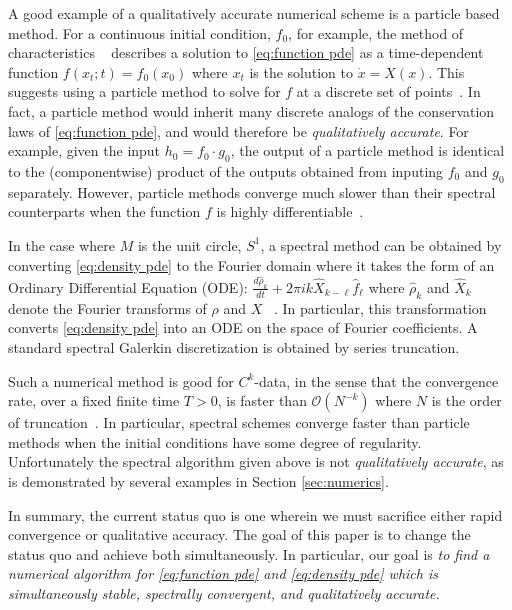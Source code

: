 \documentclass[final,leqno]{siamart}
\begin{document}
A good example of a qualitatively accurate numerical scheme is a particle based method.
For a continuous initial condition, $f_0$, for example, the method of characteristics ~\cite{Evans2010} describes a solution to \eqref{eq:function pde} as a time-dependent function $f( x_{t} ;t) = f_{0}( x_{0} )$ where $x_{t}$ is the solution to $\dot{x} = X(x)$.
This suggests using a particle method to solve for $f$ at a discrete set of points~\cite{Leveque1992}.
In fact, a particle method would inherit many discrete analogs of the conservation laws of \eqref{eq:function pde}, and would therefore be \emph{qualitatively accurate}.
For example, given the input $h_{0} = f_{0} \cdot g_{0}$, the output of a particle method is identical to the (componentwise) product of the outputs obtained from inputing $f_{0}$ and $g_{0}$ separately.
However, particle methods converge much slower than their spectral counterparts when the function $f$ is highly differentiable~\cite{Gottlieb2001}.

In the case where $M$ is the unit circle, $S^{1}$, a spectral method can be obtained by converting \eqref{eq:density pde} to the Fourier domain where it takes the form
of an Ordinary Differential Equation (ODE):
$
	\frac{d \hat{\rho}_{k}}{dt} + 2\pi i k  \widehat{X}_{k-\ell} \hat{f}_{\ell} 
$
where $\hat{\rho}_{k}$ and $\widehat{X}_{k}$ denote the Fourier transforms of $\rho$ and $X$ ~\cite{Taylor1974}.
In particular, this transformation converts \eqref{eq:density pde} into an ODE on the space of Fourier coefficients.
A standard spectral Galerkin discretization is obtained by series truncation. 

Such a numerical method is good for $C^{k}$-data, in the sense that the convergence rate, over a fixed finite time $T>0$, is faster than $\mathcal{O}(N^{-k})$  where $N$ is the order of truncation~\cite{Gottlieb2001,Gottlieb1977numerical}.
In particular, spectral schemes converge faster than particle methods when the initial conditions have some degree of regularity.
Unfortunately the spectral algorithm given above is not \emph{qualitatively accurate}, as is demonstrated by several examples in Section \ref{sec:numerics}.

In summary, the current status quo is one wherein we must sacrifice either rapid convergence or qualitative accuracy.
The goal of this paper is to change the status quo and achieve both simultaneously.  In particular, our goal is
\emph{to find a numerical algorithm for \eqref{eq:function pde} and \eqref{eq:density pde} which is simultaneously stable, spectrally convergent, and qualitatively accurate.}
\end{document}
